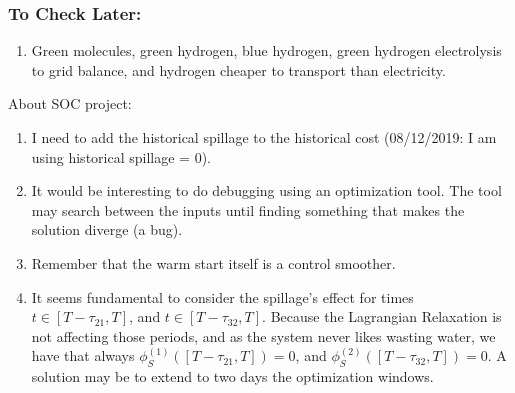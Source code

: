 \documentclass[aspectratio=169]{beamer}\usepackage[utf8]{inputenc}
\begin{document}
\begin{frame}\frametitle{To Check Later:}

\begin{enumerate}

\item Green molecules, green hydrogen, blue hydrogen, green hydrogen electrolysis to grid balance, and hydrogen cheaper to transport than electricity.

\end{enumerate}

About SOC project:

\begin{enumerate}

\item I need to add the historical spillage to the historical cost (08/12/2019: I am using historical spillage = 0).

\item It would be interesting to do debugging using an optimization tool. The tool may search between the inputs until finding something that makes the solution diverge (a bug).

\item Remember that the warm start itself is a control smoother.

\item It seems fundamental to consider the spillage's effect for times $t\in[T-\tau_{21},T]$, and $t\in[T-\tau_{32},T]$. Because the Lagrangian Relaxation is not affecting those periods, and as the system never likes wasting water, we have that always $\phi_S^{(1)}([T-\tau_{21},T])=0$, and $\phi_S^{(2)}([T-\tau_{32},T])=0$. A solution may be to extend to two days the optimization windows.

\end{enumerate}

\end{frame}
\end{document}
